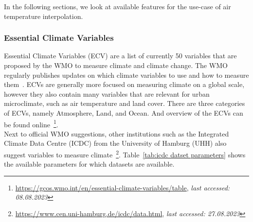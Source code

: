 In the following sections, we look at available features for the use-case of air temperature interpolation.

\subsubsection{Essential Climate Variables}

Essential Climate Variables (ECV) are a list of currently 50 variables that are proposed by the WMO to measure climate and climate change. The WMO regularly publishes updates on which climate variables to use and how to measure them~\cite{wmo2018guide}. ECVs are generally more focused on measuring climate on a global scale, however they also contain many variables that are relevant for urban microclimate, such as air temperature and land cover. There are three categories of ECVs, namely Atmosphere, Land, and Ocean. And overview of the ECVs can be found online~\footnote{\url{https://gcos.wmo.int/en/essential-climate-variables/table}, \textit{last accessed: 08.08.2023}}.\\
Next to official WMO suggestions, other institutions such as the Integrated Climate Data Centre (ICDC) from the University of Hamburg (UHH) also suggest variables to measure climate~\footnote{\url{https://www.cen.uni-hamburg.de/icdc/data.html}, \textit{last accessed: 27.08.2023}}. Table~\ref{tab:icdc datset parameters} shows the available parameters for which datasets are available.

